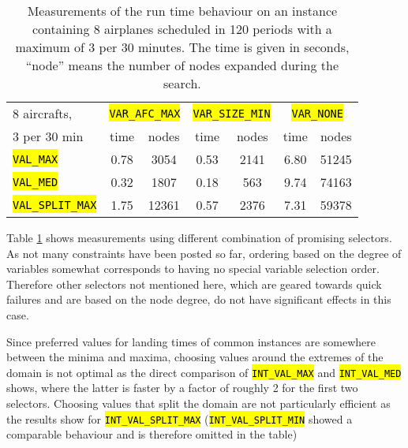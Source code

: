 \documentclass[,%
			paper=a4,%
			DIV11,
			liststotoc,
			bibtotoc,
			draft=false,%
			numbers=noendperiod
			]{scrartcl}
\newcommand{\ilc}[1]{\hl{\texttt{#1}}}
\begin{document}
\begin{table}[htbp]
	\centering
	\begin{tabular}{|p{6.5em}|c|c|c|c|c|c|}
	\hline
		 8 aircrafts,
		 & \multicolumn{2}{c|}{\ilc{VAR\_AFC\_MAX}} &
			\multicolumn{2}{c|}{\ilc{VAR\_SIZE\_MIN}}  &
			\multicolumn{2}{c|}{\ilc{VAR\_NONE}}   \\
	 3 per 30 min&
	 
	 		time & nodes &
	  	time & nodes &
	    time & nodes \\ \hline

		 \ilc{VAL\_MAX}

		 & 0.78 & 3054
		 & 0.53 & 2141
		 & 6.80 & 51245 

		 \\ \hline
		 \ilc{VAL\_MED}

		 & 0.32 & 1807
		 & 0.18 & 563
		 & 9.74 & 74163
	
		 
		 \\ \hline
		 \ilc{VAL\_SPLIT\_MAX}

		 & 1.75 & 12361
		 & 0.57 & 2376
		 & 7.31 & 59378 \\ \hline

	 
\end{tabular}
\caption{Measurements of the run time behaviour on an instance containing 8 airplanes scheduled in 120 periods with a maximum of 3 per 30 minutes. The time is given in seconds, ``node'' means the number of nodes expanded during the search.}
	\label{fig:res1}
\end{table}

Table \ref{fig:res1} shows measurements using different combination of promising selectors.
As not many constraints have been posted so far, ordering based on the degree of variables somewhat corresponds to having no special variable selection order. Therefore other selectors not mentioned here, which are geared towards quick failures and are based on the node degree, do not have significant effects in this case.

Since preferred values for landing times of common instances are somewhere between the minima and maxima, choosing values around the extremes of the domain is not optimal as the direct comparison of \ilc{INT\_VAL\_MAX} and \ilc{INT\_VAL\_MED} shows, where the latter is faster by a factor of roughly 2 for the first two selectors.
Choosing values that split the domain are not particularly efficient as the results show for \ilc{INT\_VAL\_SPLIT\_MAX} (\ilc{INT\_VAL\_SPLIT\_MIN} showed a comparable behaviour and is therefore omitted in the table)
\end{document}
